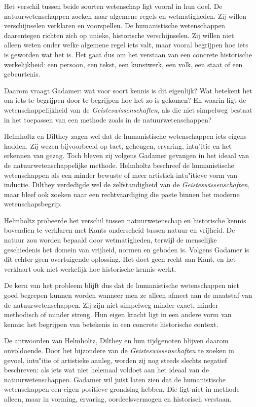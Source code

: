 \documentclass[11pt,twoside,openright]{memoir}
\begin{document}
Het verschil tussen beide soorten wetenschap ligt vooral in hun doel. De natuurwetenschappen zoeken naar algemene regels en wetmatigheden. Zij willen verschijnselen verklaren en voorspellen. De humanistische wetenschappen daarentegen richten zich op unieke, historische verschijnselen. Zij willen niet alleen weten onder welke algemene regel iets valt, maar vooral begrijpen hoe iets is geworden wat het is. Het gaat dus om het verstaan van een concrete historische werkelijkheid: een persoon, een tekst, een kunstwerk, een volk, een staat of een gebeurtenis.

Daarom vraagt Gadamer: wat voor soort kennis is dit eigenlijk? Wat betekent het om iets te begrijpen door te begrijpen hoe het zo is gekomen? En waarin ligt de wetenschappelijkheid van de \textit{Geisteswissenschaften}, als die niet simpelweg bestaat in het toepassen van een methode zoals in de natuurwetenschappen?

Helmholtz en Dilthey zagen wel dat de humanistische wetenschappen iets eigens hadden. Zij wezen bijvoorbeeld op tact, geheugen, ervaring, intu"itie en het erkennen van gezag. Toch bleven zij volgens Gadamer gevangen in het ideaal van de natuurwetenschappelijke methode. Helmholtz beschreef de humanistische wetenschappen als een minder bewuste of meer artistiek-intu"itieve vorm van inductie. Dilthey verdedigde wel de zelfstandigheid van de \textit{Geisteswissenschaften}, maar bleef ook zoeken naar een rechtvaardiging die paste binnen het moderne wetenschapsbegrip.

Helmholtz probeerde het verschil tussen natuurwetenschap en historische kennis bovendien te verklaren met Kants onderscheid tussen natuur en vrijheid. De natuur zou worden bepaald door wetmatigheden, terwijl de menselijke geschiedenis het domein van vrijheid, normen en geboden is. Volgens Gadamer is dit echter geen overtuigende oplossing. Het doet geen recht aan Kant, en het verklaart ook niet werkelijk hoe historische kennis werkt.

De kern van het probleem blijft dus dat de humanistische wetenschappen niet goed begrepen kunnen worden wanneer men ze alleen afmeet aan de maatstaf van de natuurwetenschappen. Zij zijn niet simpelweg minder exact, minder methodisch of minder streng. Hun eigen kracht ligt in een andere vorm van kennis: het begrijpen van betekenis in een concrete historische context.

De antwoorden van Helmholtz, Dilthey en hun tijdgenoten blijven daarom onvoldoende. Door het bijzondere van de \textit{Geisteswissenschaften} te zoeken in gevoel, intu"itie of artistieke aanleg, worden zij nog steeds slechts negatief beschreven: als iets wat niet helemaal voldoet aan het ideaal van de natuurwetenschappen. Gadamer wil juist laten zien dat de humanistische wetenschappen een eigen positieve grondslag hebben. Die ligt niet in methode alleen, maar in vorming, ervaring, oordeelsvermogen en historisch verstaan.
\end{document}
